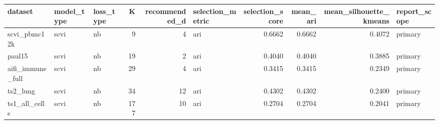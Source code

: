 \begin{tabular}{lllrrlrrrl}
\toprule
dataset & model\_type & loss\_type & K & recommended\_d & selection\_metric & selection\_score & mean\_ari & mean\_silhouette\_kmeans & report\_scope \\
\midrule
scvi\_pbmc12k & scvi & nb & 9 & 4 & ari & 0.6662 & 0.6662 & 0.4072 & primary \\
paul15 & scvi & nb & 19 & 2 & ari & 0.4040 & 0.4040 & 0.3885 & primary \\
aifi\_immune\_full & scvi & nb & 29 & 4 & ari & 0.3415 & 0.3415 & 0.2349 & primary \\
ts2\_lung & scvi & nb & 34 & 12 & ari & 0.4302 & 0.4302 & 0.2400 & primary \\
ts1\_all\_cells & scvi & nb & 177 & 10 & ari & 0.2704 & 0.2704 & 0.2041 & primary \\
\bottomrule
\end{tabular}
